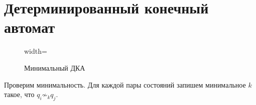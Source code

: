 \documentclass[a4paper, 12pt]{article}
\begin{document}
    \section{Детерминированный конечный автомат}



    \begin{figure}[H]
      \centering
      \begin{adjustbox}{width=\textwidth}
      
      \end{adjustbox}
      \caption{Минимальный ДКА}
      \label{fig:dfa}
    \end{figure}

    Проверим минимальность. Для каждой пары состояний запишем минимальное $k$ такое, что $q_i \not \sim_{k} q_j$.

\end{document}
